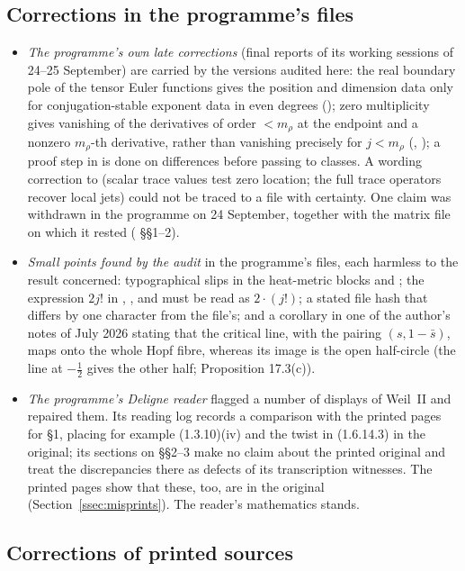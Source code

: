 \subsection{Corrections in the programme's files}

\begin{itemize}
\item \emph{The programme's own late corrections} (final reports of its working sessions of 24--25 September) are carried by the versions audited here: the real boundary pole of the tensor Euler functions gives the position and dimension data only for conjugation-stable exponent data in even degrees (); zero multiplicity gives vanishing of the derivatives of order $<m_\rho$ at the endpoint and a nonzero $m_\rho$-th derivative, rather than vanishing precisely for $j<m_\rho$ (, ); a proof step in  is done on differences before passing to classes. A wording correction to  (scalar trace values test zero location; the full trace operators recover local jets) could not be traced to a file with certainty. One claim was withdrawn in the programme on 24 September, together with the matrix file on which it rested ( §§1--2).
\item \emph{Small points found by the audit} in the programme's files, each harmless to the result concerned: typographical slips in the heat-metric blocks  and ; the expression $2j!$ in , ,  and  must be read as $2\cdot(j!)$; a stated file hash that differs by one character from the file's; and a corollary in one of the author's notes of July 2026 stating that the critical line, with the pairing $(s,1-\bar s)$, maps onto the whole Hopf fibre, whereas its image is the open half-circle (the line at $-\tfrac12$ gives the other half;  Proposition 17.3(c)).
\item \emph{The programme's Deligne reader} flagged a number of displays of Weil~II and repaired them. Its reading log records a comparison with the printed pages for §1, placing for example (1.3.10)(iv) and the twist in (1.6.14.3) in the original; its sections on §§2--3 make no claim about the printed original and treat the discrepancies there as defects of its transcription witnesses. The printed pages show that these, too, are in the original (Section~\ref{ssec:misprints}). The reader's mathematics stands.
\end{itemize}

\subsection{Corrections of printed sources}

